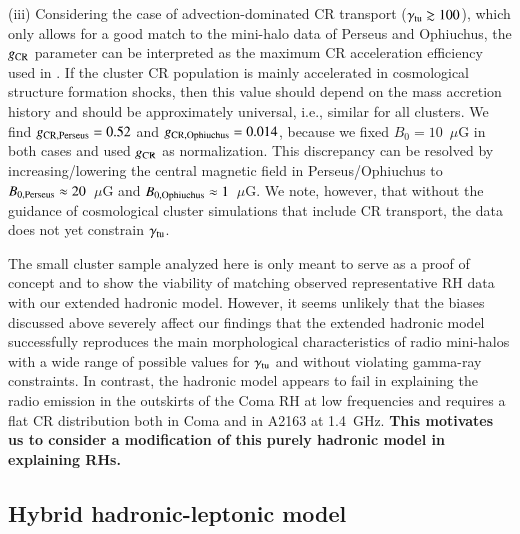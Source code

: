 \documentclass[useAMS,usenatbib]{mn2e}
\begin{document}
(iii) Considering the case of advection-dominated CR transport
($\gamma_{{\mathrm{tu}}}\gtrsim100$), which only allows for a good match to the
mini-halo data of Perseus and Ophiuchus, the $g_{{\mathrm{CR}}}$ parameter can be
interpreted as the maximum CR acceleration efficiency used in
\cite{2010MNRAS.409..449P}. If the cluster CR population is mainly accelerated
in cosmological structure formation shocks, then this value should depend on the
mass accretion history and should be approximately universal, i.e., similar for
all clusters. We find $g_{{\mathrm{CR, Perseus}}} = 0.52$ and $g_{{\mathrm{CR,
    Ophiuchus}}} = 0.014$, because we fixed $B_{0}=10$~$\mu$G in both cases and
used $g_{{\mathrm{CR}}}$ as normalization. This discrepancy can be resolved by
increasing/lowering the central magnetic field in Perseus/Ophiuchus to
$B_{0,{\mathrm{Perseus}}}\approx20$~$\mu$G and
$B_{0,{\mathrm{Ophiuchus}}}\approx1$~$\mu$G. We note, however, that without the
guidance of cosmological cluster simulations that include CR transport, the data
does not yet constrain $\gamma_{{\mathrm{tu}}}$.

The small cluster sample analyzed here is only meant to serve as a proof of
concept and to show the viability of matching observed representative RH data
with our extended hadronic model. However, it seems unlikely that the biases
discussed above severely affect our findings that the extended hadronic model
successfully reproduces the main morphological characteristics of radio
mini-halos with a wide range of possible values for $\gamma_{{\mathrm{tu}}}$ and
without violating gamma-ray constraints. In contrast, the hadronic model appears
to fail in explaining the radio emission in the outskirts of the Coma RH at low
frequencies and requires a flat CR distribution both in Coma and in A2163 at
1.4~GHz. {\bf This motivates us to consider a modification of this purely
  hadronic model in explaining RHs.}


\subsection{Hybrid hadronic-leptonic model}
\end{document}
